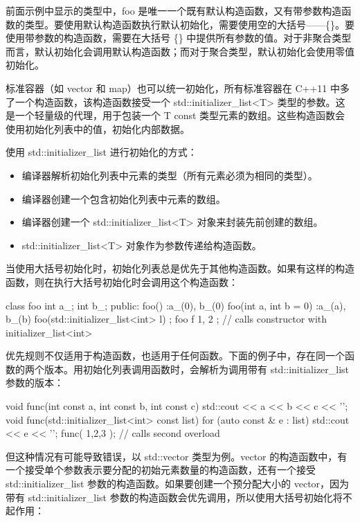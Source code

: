 前面示例中显示的类型中，foo 是唯一一个既有默认构造函数，又有带参数构造函数的类型。要使用默认构造函数执行默认初始化，需要使用空的大括号——\{\}。要使用带参数的构造函数，需要在大括号 \{\} 中提供所有参数的值。对于非聚合类型而言，默认初始化会调用默认构造函数；而对于聚合类型，默认初始化会使用零值初始化。

标准容器（如 vector 和 map）也可以统一初始化，所有标准容器在 C++11 中多了一个构造函数，该构造函数接受一个 std::initializer\_list<T> 类型的参数。这是一个轻量级的代理，用于包装一个 T const 类型元素的数组。这些构造函数会使用初始化列表中的值，初始化内部数据。

使用 std::initializer\_list 进行初始化的方式：

\begin{itemize}
\item
编译器解析初始化列表中元素的类型（所有元素必须为相同的类型）。

\item
编译器创建一个包含初始化列表中元素的数组。

\item
编译器创建一个 std::initializer\_list<T> 对象来封装先前创建的数组。

\item
std::initializer\_list<T> 对象作为参数传递给构造函数。
\end{itemize}

当使用大括号初始化时，初始化列表总是优先于其他构造函数。如果有这样的构造函数，则在执行大括号初始化时会调用这个构造函数：

\begin{cpp}
class foo
{
    int a_;
    int b_;
public:
    foo() :a_(0), b_(0) {}
    foo(int a, int b = 0) :a_(a), b_(b) {}
    foo(std::initializer_list<int> l) {}
};
foo f{ 1, 2 }; // calls constructor with initializer_list<int>
\end{cpp}

优先规则不仅适用于构造函数，也适用于任何函数。下面的例子中，存在同一个函数的两个版本。用初始化列表调用函数时，会解析为调用带有 std::initializer\_list 参数的版本：

\begin{cpp}
void func(int const a, int const b, int const c)
{
    std::cout << a << b << c << '\n';
}
void func(std::initializer_list<int> const list)
{
    for (auto const & e : list)
    std::cout << e << '\n';
}
func({ 1,2,3 }); // calls second overload
\end{cpp}

但这种情况有可能导致错误，以 std::vector 类型为例。vector 的构造函数中，有一个接受单个参数表示要分配的初始元素数量的构造函数，还有一个接受 std::initializer\_list 参数的构造函数。如果要创建一个预分配大小的 vector，因为带有 std::initializer\_list 参数的构造函数会优先调用，所以使用大括号初始化将不起作用：

